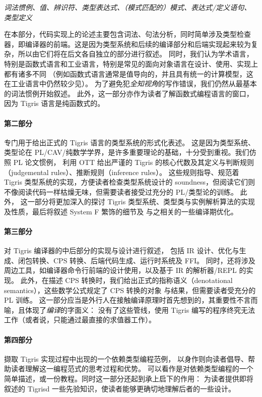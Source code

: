 \begin{center}
  \emph{词法惯例、值、辨识符、类型表达式、（模式匹配的）模式、表达式/定义语句、类型定义}
\end{center}
在本部分，代码实现上的论述主要包含词法、句法分析，同时简单涉及类型检查器，即编译器的前端。这是因为类型系统和后续的编译部分和后端实现起来较为复杂，所以由它们将在后文各自独立的部分进行叙述。
同时，我们认为学术语言，特别是函数式语言和工业语言，特别是常见的面向对象语言在设计、使用、实现上都有诸多不同
（例如函数式语言通常是值导向的，并且具有统一的计算模型，这在工业语言中仍然较少见）。
为了避免犯\emph{全知视角}的写作错误，我们仍然从最基本的词法惯例开始叙述。
此外，这一部分亦作为读者了解函数式编程语言的窗口，因为 Tigris 语言是纯函数式的。

\paragraph{第二部分}专门用于给出正式的 Tigris 语言的类型系统的形式化表述。
这是因为类型系统、类型论在 PL/CAV/纯数学学界，是许多重要理论的基础，十分受到重视。我们仿照 PL 论文惯例，
利用 OTT 给出严谨的 Tigris 的核心代数及其定义与判断规则（judgemental rules）、推断规则（inference rules）。
这些规则指导、规范着 Tigris 类型系统的实现，方便读者检查类型系统设计的 soundness，但阅读它们则不像阅读代码一样枯燥无味，但需要读者接受过充分的 PL/类型论的训练。
此外，
这一部分将更加深入的探讨 Tigris 类型系统、类型类与实例解析算法的实现及性质，最后将叙述 System F 繁饰的细节及
与之相关的一些编译期优化。

\paragraph{第三部分}对 Tigris 编译器的中后部分的实现与设计进行叙述，
包括 IR 设计、优化与生成、闭包转换、CPS 转换、后端代码生成、运行时系统及 FFI。
同时，还将涉及周边工具，如编译器命令行前端的设计使用，以及基于 IR 的解析器/REPL 的实现。
此外，在描述 CPS 转换时，我们给出正式的指称语义（denotational semantics），这些数学公式规定了 CPS 转换的对象
与结果，但需要读者受充分的 PL 训练。
这一部分应当是外行人在接触编译原理时首先想到的，其重要性不言而喻，且体现了\emph{编译}的字面义：
没有了这些管线，使用 Tigris 编写的程序终究无法工作（或者说，只能通过最直接的求值器工作）。

\paragraph{第四部分}撷取 Tigris 实现过程中出现的一个依赖类型编程范例，
以身作则向读者倡导、帮助读者理解这一编程范式的思考过程和优势。
可以看作是对依赖类型编程的一个简单描述，或一份教程。同时这一部分还起到承上启下的作用：
为读者提供即将叙述的 Tigrisd 一些先验知识，使读者能够更确切地理解后者的一些设计。

